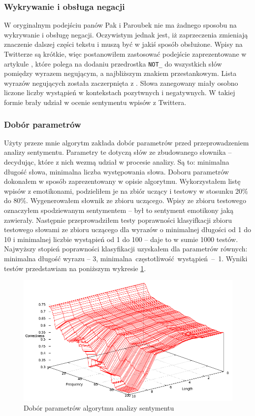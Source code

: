 \subsubsection{Wykrywanie i obsługa negacji}
W oryginalnym podejściu panów Pak i Paroubek nie ma żadnego sposobu na
wykrywanie i obsługę negacji. Oczywistym jednak jest, iż zaprzeczenia zmieniają
znaczenie dalszej części tekstu i muszą być w jakiś sposób obsłużone.
Wpisy na Twitterze są krótkie, więc postanowiłem zastosować podejście
zaprezentowane w artykule \cite{thumbsUp2002}, które polega na dodaniu
przedrostka \texttt{NOT\_} do wszystkich słów pomiędzy wyrazem negującym,
a najbliższym znakiem przestankowym. Lista wyrazów negujących
została zaczerpnięta z \cite{englishNots1983}. Słowa zanegowany miały osobno
liczone liczby wystąpień w kontekstach pozytwnych i negatywnych. W takiej formie
brały udział w ocenie sentymentu wpisów z Twittera.


\subsubsection{Dobór parametrów}
Użyty przeze mnie algorytm zakłada dobór parametrów przed przeprowadzeniem
analizy sentymentu. Parametry te dotyczą słów ze zbudowanego słownika --
decydując, które z nich wezmą udział w procesie analizy. Są to: minimalna
długość słowa, minimalna liczba występowania słowa. Doboru parametrów dokonałem
w sposób zaprezentowany w opisie algorytmu. Wykorzystałem listę wpisów z
emotikonami, podzieliłem je na zbiór uczący i testowy w stosunku 20\% do 80\%.
Wygenerowałem słownik ze zbioru uczącego. Wpisy ze zbioru testowego oznaczyłem spodziewanym
sentymentem -- był to sentyment emotikony jaką zawierały. Następnie
przeprowadziłem testy poprawności klasyifkacji zbioru testowego słowami ze
zbioru uczącego dla wyrazów o minimalnej długości od 1 do 10 i minimalnej
liczbie wystąpień od 1 do 100 -- daje to w sumie 1000 testów.
Najwyższy stopień poprawności klasyfikacji uzyskałem dla parametrów równych:
minimalna długość wyrazu -- 3, \mbox{minimalna częstotliwość wystąpień -- 1}.
Wyniki testów przedstawiam na poniższym wykresie
\ref{image:pak-paroubek-parametry}.

\begin{figure}[ht!]
\centering
\includegraphics[width=140mm]{img/pak-paroubek-params.png}
\caption{Dobór parametrów algorytmu analizy sentymentu}
\label{image:pak-paroubek-parametry}
\end{figure}

